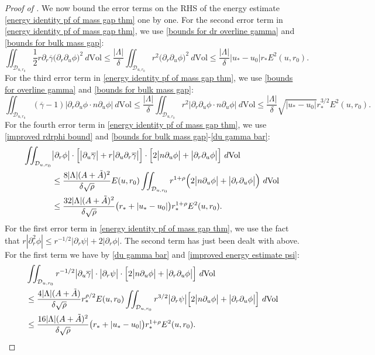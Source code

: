 \documentclass[11pt]{article}
\numberwithin{equation}{section}
\begin{document}
\begin{proof}[Proof of ]
We now bound the error terms on the RHS of the energy estimate \eqref{energy identity pf of mass gap thm} one by one. For the second error term in \eqref{energy identity pf of mass gap thm}, we use \eqref{bounds for dr overline gamma} and \eqref{bounds for bulk mass gap}:
\[\iint_{\mathcal{D}_{u,r_0}}\frac{1}{2}r\partial_r\overline{\gamma}\big(\partial_r\partial_u\phi\big)^2\ d\mathrm{Vol}\leq\frac{|\Lambda|}{\delta}\iint_{\mathcal{D}_{u,r_0}}r^2\big(\partial_r\partial_u\phi\big)^2\ d\mathrm{Vol}\leq\frac{|\Lambda|}{\delta}|u_*-u_0|r_*E^2(u,r_0).\]
For the third error term in \eqref{energy identity pf of mass gap thm}, we use \eqref{bounds for overline gamma} and \eqref{bounds for bulk mass gap}:
\[\iint_{\mathcal{D}_{u,r_0}}(\overline{\gamma}-1)\big|\partial_r\partial_u\phi\cdot n\partial_u\phi\big|\ d\mathrm{Vol}\leq\frac{|\Lambda|}{\delta}\iint_{\mathcal{D}_{u,r_0}}r^2\big|\partial_r\partial_u\phi\cdot n\partial_u\phi\big|\ d\mathrm{Vol}\leq\frac{|\Lambda|}{\delta}\sqrt{|u_*-u_0|}r_*^{3/2}E^2(u,r_0).\]
For the fourth error term in \eqref{energy identity pf of mass gap thm}, we use \eqref{improved rdrphi bound} and \eqref{bounds for bulk mass gap}-\eqref{du gamma bar}:
\begin{align*}
    \iint_{\mathcal{D}_{u,r_0}}&\big|\partial_r\phi\big|\cdot\Big[\big|\partial_u\overline{\gamma}\big|+r\big|\partial_u\partial_r\overline{\gamma}\big|\Big]\cdot\Big[2\big|n\partial_u\phi\big|+\big|\partial_r\partial_u\phi\big|\Big]\ d\mathrm{Vol}\\
    &\leq\frac{8|\Lambda|(A+\Tilde{A})^2}{\delta\sqrt{\rho}}E(u,r_0)\iint_{\mathcal{D}_{u,r_0}}r^{1+\rho}\Big(2\big|n\partial_u\phi\big|+\big|\partial_r\partial_u\phi\big|\Big)\ d\mathrm{Vol}\\
    &\leq\frac{32|\Lambda|(A+\Tilde{A})^2}{\delta\sqrt{\rho}}\big(r_*+|u_*-u_0|\big)r_*^{1+\rho}E^2(u,r_0).
\end{align*}
For the first error term in \eqref{energy identity pf of mass gap thm}, we use the fact that $r|\partial_r^2\phi|\leq r^{-1/2}|\partial_r\psi|+2|\partial_r\phi|.$ The second term has just been dealt with above. For the first term we have by \eqref{du gamma bar} and \eqref{improved energy estimate psi}:
\begin{align*}
    &\iint_{\mathcal{D}_{u,r_0}}r^{-1/2}\big|\partial_u\overline{\gamma}\big|\cdot\big|\partial_r\psi\big|\cdot \Big[2\big|n\partial_u\phi\big|+\big|\partial_r\partial_u\phi\big|\Big]\ d\mathrm{Vol}\\
    &\leq\frac{4|\Lambda|(A+\Tilde{A})}{\delta\sqrt{\rho}}r_*^{\rho/2}E(u,r_0)\iint_{\mathcal{D}_{u,r_0}}r^{3/2}\big|\partial_r\psi\big|\Big[2\big|n\partial_u\phi\big|+\big|\partial_r\partial_u\phi\big|\Big]\ d\mathrm{Vol}\\
    &\leq\frac{16|\Lambda|(A+\Tilde{A})^2}{\delta\sqrt{\rho}}\big(r_*+|u_*-u_0|\big)r_*^{1+\rho}E^2(u,r_0).
\end{align*}


\end{proof}
\end{document}
